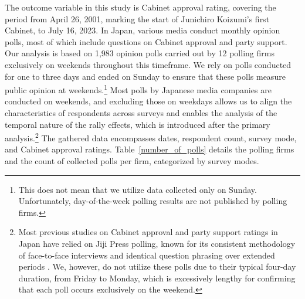 \documentclass[letterpaper,12pt]{scrartcl}
\begin{document}
The outcome variable in this study is Cabinet approval rating, covering the period from April 26, 2001, marking the start of Junichiro Koizumi's first Cabinet, to July 16, 2023. In Japan, various media conduct monthly opinion polls, most of which include questions on Cabinet approval and party support. Our analysis is based on 1,983 opinion polls carried out by 12 polling firms exclusively on weekends throughout this timeframe. We rely on polls conducted for one to three days and ended on Sunday to ensure that these polls measure public opinion at weekends.\footnote{This does not mean that we utilize data collected only on Sunday. Unfortunately, day-of-the-week polling results are not published by polling firms.} Most polls by Japanese media companies are conducted on weekends, and excluding those on weekdays allows us to align the characteristics of respondents across surveys and enables the analysis of the temporal nature of the rally effects, which is introduced after the primary analysis.\footnote{Most previous studies on Cabinet approval and party support ratings in Japan have relied on Jiji Press polling, known for its consistent methodology of face-to-face interviews and identical question phrasing over extended periods \citep[e.g.,][]{krauss2005}. We, however, do not utilize these polls due to their typical four-day duration, from Friday to Monday, which is excessively lengthy for confirming that each poll occurs exclusively on the weekend.} The gathered data encompasses dates, respondent count, survey mode, and Cabinet approval ratings. Table~\ref{number_of_polls} details the polling firms and the count of collected polls per firm, categorized by survey modes.
\end{document}
